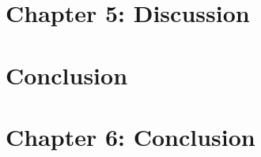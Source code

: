 \documentclass[12pt, TexShade, letterpaper]{report}
\makeatletter
\newcommand{\unchapter}[1]{%
  \begingroup
  \let\@makechapterhead\@gobble %
  \chapter{#1}
  \endgroup
}
\makeatother
\begin{document}
\chapter*{Chapter 5: Discussion}
\label{chap:discussion}


\unchapter{Conclusion}
\chapter*{Chapter 6: Conclusion}
\label{chap:conclusion}

\cleardoublepage
{}
\begin{singlespace}
\printbibliography[keyword = mainbib, title={Master reference list}, heading=bibintoc]%
\end{singlespace}


%


%
%








%
%


%

%
\end{document}
